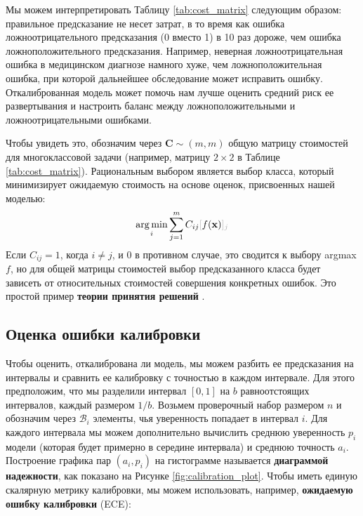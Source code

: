 Мы можем интерпретировать Таблицу \ref{tab:cost_matrix} следующим образом: правильное предсказание не несет затрат, в то время как ошибка ложноотрицательного предсказания (0 вместо 1) в 10 раз дороже, чем ошибка ложноположительного предсказания. Например, неверная ложноотрицательная ошибка в медицинском диагнозе намного хуже, чем ложноположительная ошибка, при которой дальнейшее обследование может исправить ошибку. Откалиброванная модель может помочь нам лучше оценить средний риск ее развертывания и настроить баланс между ложноположительными и ложноотрицательными ошибками.

Чтобы увидеть это, обозначим через $\mathbf{C} \sim (m, m)$ общую матрицу стоимостей для многоклассовой задачи (например, матрицу $2\times2$ в Таблице \ref{tab:cost_matrix}). Рациональным выбором является выбор класса, который минимизирует ожидаемую стоимость на основе оценок, присвоенных нашей моделью:
%
$$
\underset{i}{\arg\min} \sum_{j=1}^m C_{ij} \idx{f(\mathbf{x})}{j}
$$
%
Если $C_{ij} = 1$, когда $i \neq j$, и $0$ в противном случае, это сводится к выбору argmax $f$, но для общей матрицы стоимостей выбор предсказанного класса будет зависеть от относительных стоимостей совершения конкретных ошибок. Это простой пример \textbf{теории принятия решений} \cite{bishop2006pattern}.

\subsection{Оценка ошибки калибровки}

Чтобы оценить, откалибрована ли модель, мы можем разбить ее предсказания на интервалы и сравнить ее калибровку с точностью в каждом интервале. Для этого предположим, что мы разделили интервал $[0,1]$ на $b$ равноотстоящих интервалов, каждый размером $1/b$. Возьмем проверочный набор размером $n$ и обозначим через $\mathcal{B}_i$ элементы, чья уверенность попадает в интервал $i$. Для каждого интервала мы можем дополнительно вычислить среднюю уверенность $p_i$ модели (которая будет примерно в середине интервала) и среднюю точность $a_i$. Построение графика пар $(a_i, p_i)$ на гистограмме называется \textbf{диаграммой надежности}, как показано на Рисунке \ref{fig:calibration_plot}. Чтобы иметь единую скалярную метрику калибровки, мы можем использовать, например, \textbf{ожидаемую ошибку калибровки} (ECE):

